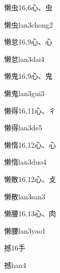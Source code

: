 \begin{Entry}{懒虫}{16,6}{⼼、⾍}
  \begin{Phonetics}{懒虫}{lan3chong2}
  \end{Phonetics}
\end{Entry}

\begin{Entry}{懒怠}{16,9}{⼼、⼼}
  \begin{Phonetics}{懒怠}{lan3dai4}
  \end{Phonetics}
\end{Entry}

\begin{Entry}{懒鬼}{16,9}{⼼、⿁}
  \begin{Phonetics}{懒鬼}{lan3gui3}
  \end{Phonetics}
\end{Entry}

\begin{Entry}{懒得}{16,11}{⼼、⼻}
  \begin{Phonetics}{懒得}{lan3de5}
  \end{Phonetics}
\end{Entry}

\begin{Entry}{懒惰}{16,12}{⼼、⼼}
  \begin{Phonetics}{懒惰}{lan3duo4}
  \end{Phonetics}
\end{Entry}

\begin{Entry}{懒散}{16,12}{⼼、⽁}
  \begin{Phonetics}{懒散}{lan3san3}
  \end{Phonetics}
\end{Entry}

\begin{Entry}{懒腰}{16,13}{⼼、⾁}
  \begin{Phonetics}{懒腰}{lan3yao1}
  \end{Phonetics}
\end{Entry}

\begin{Entry}{撼}{16}{⼿}
  \begin{Phonetics}{撼}{han4}
  \end{Phonetics}
\end{Entry}

